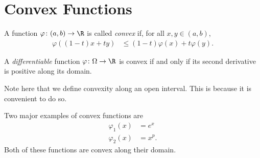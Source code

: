 \documentclass[10pt]{mypackage}
\begin{document}
\section{Convex Functions}%
\begin{definition}
  A function $\varphi\colon (a,b) \rightarrow \R$ is called \textit{convex} if, for all $x,y\in (a,b)$,
  \begin{align*}
    \varphi\left( \left( 1-t \right)x + ty\right) &\leq \left( 1-t \right)\varphi\left( x \right) + t\varphi\left( y \right).
  \end{align*}
\end{definition}
\begin{remark}
A \textit{differentiable} function $\varphi\colon \Omega \rightarrow \R$ is convex if and only if its second derivative is positive along its domain.\newline

Note here that we define convexity along an open interval. This is because it is convenient to do so.
\end{remark}
Two major examples of convex functions are
\begin{align*}
  \varphi_1(x) &= e^{x}\\
  \varphi_2(x) &= x^{p}.\tag*{$1\leq p < \infty$}
\end{align*}
Both of these functions are convex along their domain.\newline
\end{document}

